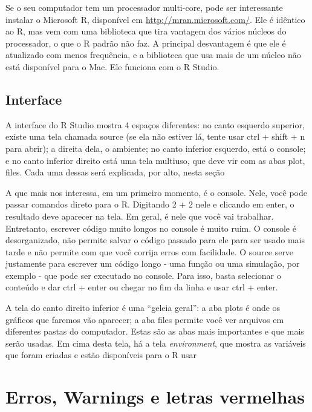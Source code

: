 \documentclass[
]{book}
\begin{document}
Se o seu computador tem um processador multi-core, pode ser interessante instalar o Microsoft R, disponível em \url{http://mran.microsoft.com/}. Ele é idêntico ao R, mas vem com uma biblioteca que tira vantagem dos vários núcleos do processador, o que o R padrão não faz. A principal desvantagem é que ele é atualizado com menos frequência, e a biblioteca que usa mais de um núcleo não está disponível para o Mac. Ele funciona com o R Studio.

\hypertarget{interface}{%
\subsection{Interface}\label{interface}}

A interface do R Studio mostra 4 espaços diferentes: no canto esquerdo superior, existe uma tela chamada source (se ela não estiver lá, tente usar ctrl + shift + n para abrir); a direita dela, o ambiente; no canto inferior esquerdo, está o console; e no canto inferior direito está uma tela multiuso, que deve vir com as abas plot, files. Cada uma dessas será explicada, por alto, nesta seção

A que mais nos interessa, em um primeiro momento, é o console. Nele, você pode passar comandos direto para o R. Digitando 2 + 2 nele e clicando em enter, o resultado deve aparecer na tela. Em geral, é nele que você vai trabalhar. Entretanto, escrever código muito longos no console é muito ruim. O console é desorganizado, não permite salvar o código passado para ele para ser usado mais tarde e não permite com que você corrija erros com facilidade. O source serve justamente para escrever um código longo - uma função ou uma simulação, por exemplo - que pode ser executado no console. Para isso, basta selecionar o conteúdo e dar ctrl + enter ou chegar no fim da linha e usar ctrl + enter.

A tela do canto direito inferior é uma ``geleia geral'': a aba plots é onde os gráficos que faremos vão aparecer; a aba files permite você ver arquivos em diferentes pastas do computador. Estas são as abas mais importantes e que mais serão usadas. Em cima desta tela, há a tela \emph{environment}, que mostra as variáveis que foram criadas e estão disponíveis para o R usar

\hypertarget{erros-warnings-e-letras-vermelhas}{%
\section{Erros, Warnings e letras vermelhas}\label{erros-warnings-e-letras-vermelhas}}
\end{document}
